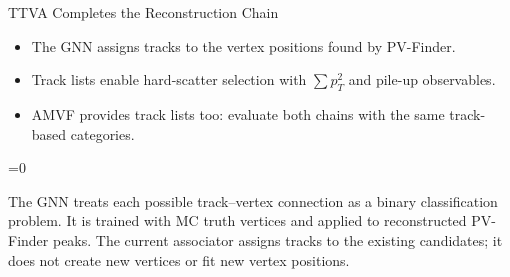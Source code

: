 \documentclass[xcolor=table,aspectratio=169]{beamer}
\providecommand{\talkbuild}{0}
\newcommand{\readingonly}[1]{\ifnum\talkbuild=0\relax#1\fi}
\newcommand{\readingnote}[1]{\readingonly{\par\vspace{.35em}%
  {\footnotesize\color{black!65}#1\par}}}
\begin{document}
\begin{frame}{TTVA Completes the Reconstruction Chain}
\relax

\centering
{}
\par\vspace{1.4em}
\begin{itemize}\setlength\itemsep{.65em}\small
\item The GNN assigns tracks to the vertex positions found by PV-Finder.
\item Track lists enable hard-scatter selection with $\sum p_T^2$ and pile-up observables.
\item AMVF provides track lists too: evaluate both chains with the same track-based categories.
\end{itemize}
\readingnote{The GNN treats each possible track--vertex connection as a binary classification problem. It is trained with MC truth vertices and applied to reconstructed PV-Finder peaks. The current associator assigns tracks to the existing candidates; it does not create new vertices or fit new vertex positions.}
\end{frame}
\end{document}
